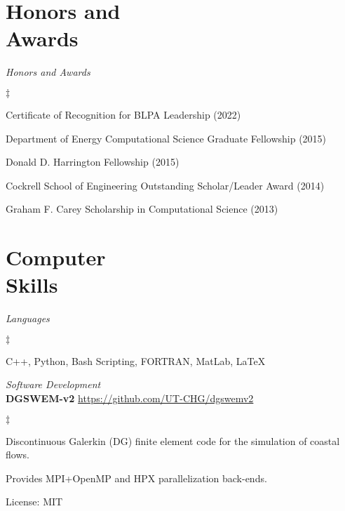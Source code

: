 \documentclass[margin,line]{res}
\newenvironment{list2}{
  \begin{list}{$\ddagger$}{%
      \setlength{\itemsep}{0in}
      \setlength{\parsep}{0in} \setlength{\parskip}{0in}
      \setlength{\topsep}{0in} \setlength{\partopsep}{0in}
      \setlength{\leftmargin}{0.2in}}}{\end{list}}
\begin{document}
\begin{resume}
\section{\sc Honors and \\ Awards}

\textit{Honors and Awards}
\vspace{0.05in}
\begin{list2}
\item[] Certificate of Recognition for BLPA Leadership (2022)
\item[] Department of Energy Computational Science Graduate Fellowship (2015)
\item[] Donald D. Harrington Fellowship (2015)
\item[] Cockrell School of Engineering Outstanding Scholar/Leader Award (2014)
\item[] Graham F. Carey Scholarship in Computational Science (2013)
\end{list2}





\section{\sc Computer \\ Skills}

\textit{Languages}
\vspace{0.05in}
\begin{list2}
\item C++, Python, Bash Scripting, FORTRAN, MatLab, \LaTeX
\end{list2}

\textit{Software Development}\\
\vspace{0.05in}
{\bf DGSWEM-v2} \hfill \url{https://github.com/UT-CHG/dgswemv2}
\begin{list2}
\item Discontinuous Galerkin (DG) finite element code for the simulation of coastal flows.
\item Provides MPI+OpenMP and HPX parallelization back-ends.
\item License: MIT
\end{list2}


\end{resume}
\end{document}
